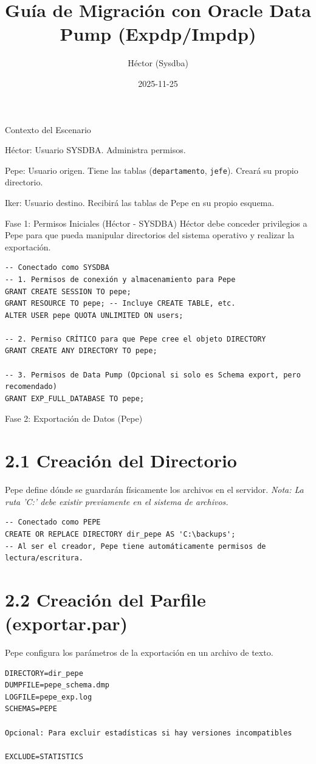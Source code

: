 \documentclass[11pt]{article}
\author{Héctor (Sysdba)}
\date{2025-11-25}
\title{Guía de Migración con Oracle Data Pump (Expdp/Impdp)}
\begin{document}
\maketitle
\tableofcontents

Contexto del Escenario

Héctor: Usuario SYSDBA. Administra permisos.

Pepe: Usuario origen. Tiene las tablas (\texttt{departamento}, \texttt{jefe}). Creará su propio directorio.

Iker: Usuario destino. Recibirá las tablas de Pepe en su propio esquema.

Fase 1: Permisos Iniciales (Héctor - SYSDBA)
Héctor debe conceder privilegios a Pepe para que pueda manipular directorios del sistema operativo y realizar la exportación.

\begin{verbatim}
-- Conectado como SYSDBA
-- 1. Permisos de conexión y almacenamiento para Pepe
GRANT CREATE SESSION TO pepe;
GRANT RESOURCE TO pepe; -- Incluye CREATE TABLE, etc.
ALTER USER pepe QUOTA UNLIMITED ON users;

-- 2. Permiso CRÍTICO para que Pepe cree el objeto DIRECTORY
GRANT CREATE ANY DIRECTORY TO pepe;

-- 3. Permisos de Data Pump (Opcional si solo es Schema export, pero recomendado)
GRANT EXP_FULL_DATABASE TO pepe;
\end{verbatim}

Fase 2: Exportación de Datos (Pepe)
\section{2.1 Creación del Directorio}
\label{sec:org6f0e03c}
Pepe define dónde se guardarán físicamente los archivos en el servidor.
\emph{Nota: La ruta 'C:\backups' debe existir previamente en el sistema de archivos.}

\begin{verbatim}
-- Conectado como PEPE
CREATE OR REPLACE DIRECTORY dir_pepe AS 'C:\backups';
-- Al ser el creador, Pepe tiene automáticamente permisos de lectura/escritura.
\end{verbatim}
\section{2.2 Creación del Parfile (exportar.par)}
\label{sec:orgde23a96}
Pepe configura los parámetros de la exportación en un archivo de texto.

\begin{verbatim}
DIRECTORY=dir_pepe
DUMPFILE=pepe_schema.dmp
LOGFILE=pepe_exp.log
SCHEMAS=PEPE

Opcional: Para excluir estadísticas si hay versiones incompatibles

EXCLUDE=STATISTICS

\end{verbatim}
\end{document}
